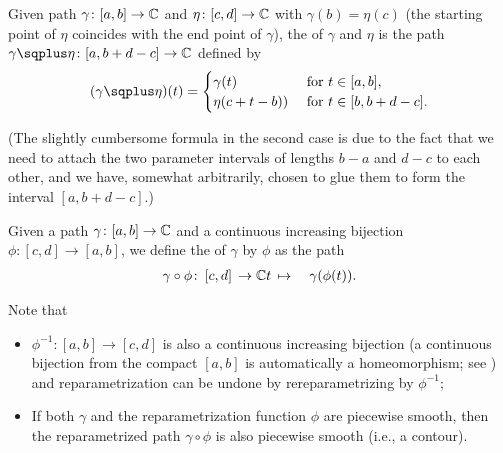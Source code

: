 \begin{definition}
  \label{def:path_concatenation}
  Given path $\gamma \colon [a,b] \to \mathbb{C}$ and
  $\eta \colon [c,d] \to \mathbb{C}$ with $\gamma(b) = \eta(c)$
  (the starting point of $\eta$ coincides with the end point of $\gamma$),
  the  of $\gamma$ and $\eta$ is the path
  $\gamma \concat \eta \colon [a,b+d-c] \to \bC$ defined by
  \begin{align*}
    (\gamma \concat \eta)(t) =
    \begin{cases}
      \gamma(t) & \text{ for } t \in [a,b] , \\
      \eta(c+t-b)) & \text{ for } t \in [b,b+d-c] .
    \end{cases}
  \end{align*}

  (The slightly cumbersome formula in the second case is due to the fact
  that we need to attach the two parameter intervals of lengths
  $b-a$ and $d-c$ to each other, and we have, somewhat arbitrarily,
  chosen to glue them to form the interval $[a,b+d-c]$.)
\end{definition}

\begin{definition}
  \label{def:path_reparametrization}
  Given a path $\gamma \colon [a,b] \to \mathbb{C}$ and a continuous increasing
  bijection $\phi \colon [c,d] \to [a,b]$, we define the 
  of $\gamma$ by $\phi$ as the path
  \begin{align*}
    \gamma \circ \phi \colon \, [c,d] \, \to \; & \mathbb{C}
    t \, \mapsto \; & \gamma(\phi(t)) .
  \end{align*}

  Note that
  \begin{itemize}
    \item $\phi^{-1} \colon [a,b] \to [c,d]$ is also a continuous increasing
      bijection (a continuous bijection from the
      compact $[a,b]$ is automatically a homeomorphism; see ) and
      reparametrization can be undone by rereparametrizing by $\phi^{-1}$;
    \item If both $\gamma$ and the reparametrization function $\phi$ are
      piecewise smooth, then the reparametrized path $\gamma \circ \phi$
      is also piecewise smooth (i.e., a contour).
  \end{itemize}
\end{definition}



